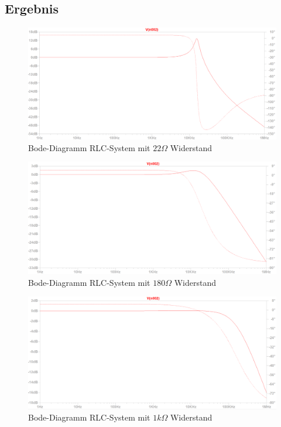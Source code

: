 \documentclass[12pt,a4paper,titlepage]{article}
\begin{document}
\subsection{Ergebnis}
\begin{figure}[H]
  \centering
  \includegraphics[width=150mm]{bode_filter03_22o.PNG}
  \caption{Bode-Diagramm RLC-System mit $22 \Omega$ Widerstand}
\end{figure}
\begin{figure}[H]
  \centering
  \includegraphics[width=150mm]{bode_filter03_180o.PNG}
  \caption{Bode-Diagramm RLC-System mit $180 \Omega$ Widerstand}
\end{figure}
\begin{figure}[H]
  \centering
  \includegraphics[width=150mm]{bode_filter03_1ko.PNG}
  \caption{Bode-Diagramm RLC-System mit $1 k\Omega$ Widerstand}
\end{figure}
\end{document}
